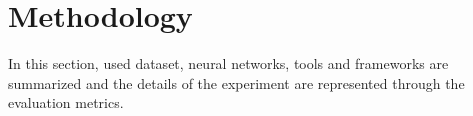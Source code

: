 \chapter{Methodology}

    In this section, used dataset, neural networks, tools and frameworks are summarized and the details of the experiment are represented through the evaluation metrics.

    

    

    

    

    
